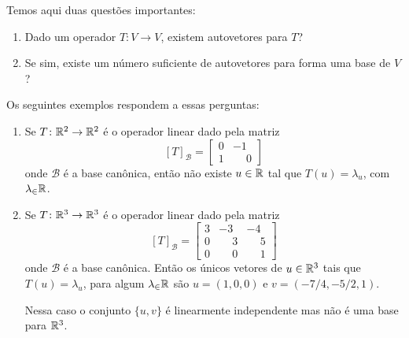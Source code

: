 Temos aqui duas questões importantes:
\begin{enumerate}
    \item Dado um operador $T \colon V \to V$, existem autovetores para $T$?

    \item Se sim, existe um número suficiente de autovetores para forma uma base de $V$?
\end{enumerate}

Os seguintes exemplos respondem a essas perguntas:

\begin{exemplos}
    \begin{enumerate}
        \item Se $T \colon \mathbb{R}^2 \to \mathbb{R}^2$ é o operador linear dado pela matriz
        \[
            [T]_\mathcal{B} = \begin{bmatrix}0 & -1\\1 & \phantom{-}0\end{bmatrix}
        \]
        onde $\mathcal{B}$ é a base canônica, então não existe $u \in \mathbb{R}$ tal que $T(u) = \lambda_u$, com $\lambda_\in \mathbb{R}$.

        \item Se $T \colon \mathbb{R}^3 \to \mathbb{R}^3$ é o operador linear dado pela matriz
        \[
        [T]_\mathcal{B} = \begin{bmatrix}3 & -3 & -4\\0 & \phantom{-}3 & \phantom{-}5\\0 & \phantom{-}0 & \phantom{-}1\end{bmatrix}
        \]
        onde $\mathcal{B}$ é a base canônica. Então os únicos vetores de $u \in \mathbb{R}^3$ tais que $T(u) = \lambda_u$, para algum $\lambda_\in \mathbb{R}$ são $u = (1, 0, 0)$ e $v = (-7/4, -5/2, 1)$.

        Nessa caso o conjunto $\{u, v\}$ é linearmente independente mas não é uma base para $\mathbb{R}^3$.
    \end{enumerate}
\end{exemplos}

